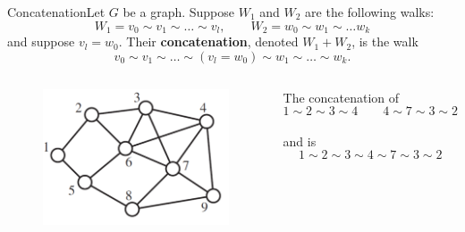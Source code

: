 \documentclass{beamer}
\def\bl[#1]#2{\begin{block}{#1}#2\end{block}}
\begin{document}
\begin{frame}
\bl[Concatenation]{Let $G$ be a graph. Suppose $W_1$ and $W_2$ are the following walks:
\[
W_1=v_0\sim v_1\sim\dots\sim v_l,\qquad W_2=w_0\sim w_1\sim\dots w_k
\]
and suppose $v_l=w_0$. Their \textbf{concatenation}, denoted $W_1+W_2$, is the walk
\[
v_0\sim v_1\sim\dots\sim (v_l=w_0)\sim w_1\sim\dots\sim w_k.
\]}

\begin{columns}
\begin{figure}
\centering
\includegraphics[scale=0.3]{WalkGraph.pdf}
\end{figure}
The concatenation of\vspace{-0.1cm}
\[
1\sim 2\sim 3\sim 4\qquad 4\sim 7\sim 3\sim 2
\]\vspace{-0.5cm}\\
and\vspace{-0.2cm}
is
\[
1\sim 2\sim 3\sim 4\sim 7\sim 3\sim 2
\]
\end{columns}
\end{frame}
\end{document}
